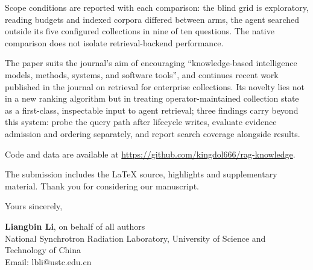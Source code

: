 \documentclass[11pt,a4paper]{article}
\begin{document}
Scope conditions are reported with each comparison: the blind grid is
exploratory, reading budgets and indexed corpora differed between arms,
the agent searched outside its five configured collections in nine of ten
questions. The native comparison does not isolate retrieval-backend
performance.

The paper suits the journal's aim of encouraging
``knowledge-based intelligence models, methods, systems, and software
tools'', and continues recent work published in the journal on retrieval
for enterprise collections. Its novelty lies not in a new ranking
algorithm but in treating operator-maintained collection state as a
first-class, inspectable input to agent retrieval; three findings carry
beyond this system: probe the query path after lifecycle writes, evaluate
evidence admission and ordering separately, and report search coverage
alongside results.

Code and data are available at \url{https://github.com/kingdol666/rag-knowledge}.

The submission includes the \LaTeX{} source, highlights and supplementary
material. Thank you for considering our manuscript.

Yours sincerely,

\medskip
\textbf{Liangbin Li}, on behalf of all authors\\
{}National Synchrotron Radiation Laboratory, University of Science and Technology of China\\
{}Email: lbli@ustc.edu.cn
\end{document}
